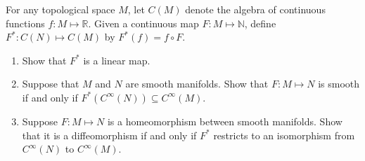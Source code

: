 For any topological space $M$, let $C(M)$ denote the algebra of continuous functions $f:M\mapsto\mathbb{R}$.  Given a continuous map $F:M\mapsto\mathbb{N}$, define $F^*:C(N)\mapsto C(M)$ by $F^*(f) = f \circ F$.

\begin{enumerate}
\item Show that $F^*$ is a linear map.
\item Suppose that $M$ and $N$ are smooth manifolds.  Show that $F:M\mapsto N$ is smooth if and only if $F^*(C^\infty(N))\subseteq C^\infty(M)$.
\item Suppose $F:M\mapsto N$ is a homeomorphism between smooth manifolds.  Show that it is a diffeomorphism if and only if $F^*$ restricts to an isomorphism from $C^\infty(N)$ to $C^\infty(M)$.
\end{enumerate}